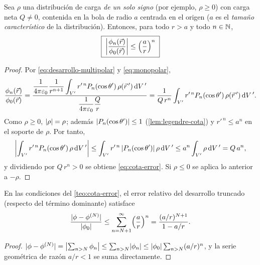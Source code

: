 \begin{teorema}\label{teo:cota-error}
Sea $\rho$ una distribución de carga \emph{de un solo signo} (por ejemplo, $\rho\ge0$) con carga neta $Q\neq0$, contenida en la bola de radio $a$ centrada en el origen
($a$ es el \emph{tamaño característico} de la distribución). Entonces, para todo $r>a$ y todo $n\in\mathbb{N}$,
\begin{equation}\label{eq:cota-error}
  \boxed{\;\left\lvert\frac{\phi_{n}(\vec{r})}{\phi_{0}(\vec{r})}\right\rvert\le\Bigl(\frac{a}{r}\Bigr)^{n}\;}
\end{equation}
\end{teorema}
\begin{proof}
Por \cref{eq:desarrollo-multipolar} y \cref{eq:monopolar},
\[
  \frac{\phi_{n}(\vec{r})}{\phi_{0}(\vec{r})}=\frac{\dfrac{1}{4\pi\varepsilon_{0}}\dfrac{1}{r^{n+1}}\displaystyle\int_{V'}r'^{\,n}P_{n}(\cos\theta')\,\rho(\vec{r}\,')\,\mathrm{d} V\,'}{\dfrac{1}{4\pi\varepsilon_{0}}\dfrac{Q}{r}}
  =\frac{1}{Q\,r^{n}}\int_{V'}r'^{\,n}P_{n}(\cos\theta')\,\rho(\vec{r}\,')\,\mathrm{d} V\,' .
\]
Como $\rho\ge0$, $\lvert \rho\rvert=\rho$; además $\lvert P_{n}(\cos\theta')\rvert\le1$ (\cref{lem:legendre-cota}) y $r'^{\,n}\le a^{n}$ en el soporte de $\rho$. Por tanto,
\[
  \left\lvert\int_{V'}r'^{\,n}P_{n}(\cos\theta')\,\rho\,\mathrm{d} V\,'\right\rvert\le\int_{V'}r'^{\,n}\,\lvert P_{n}(\cos\theta')\rvert\,\rho\,\mathrm{d} V\,'\le a^{n}\int_{V'}\rho\,\mathrm{d} V\,'=Q\,a^{n},
\]
y dividiendo por $Q\,r^{n}>0$ se obtiene \cref{eq:cota-error}. Si $\rho\le0$ se aplica lo anterior a $-\rho$.
\end{proof}

\begin{corolario}\label{cor:resto}
En las condiciones del \cref{teo:cota-error}, el error relativo del desarrollo truncado (respecto del término dominante) satisface
\begin{equation}\label{eq:resto}
  \frac{\lvert \phi-\phi^{(N)}\rvert}{\lvert \phi_{0}\rvert}\le\sum_{n=N+1}^{\infty}\Bigl(\frac{a}{r}\Bigr)^{n}=\frac{(a/r)^{N+1}}{1-a/r}.
\end{equation}
\end{corolario}
\begin{proof}
$\lvert \phi-\phi^{(N)}\rvert=\bigl\lvert\sum_{n>N}\phi_{n}\bigr\rvert\le\sum_{n>N}\lvert \phi_{n}\rvert\le\lvert \phi_{0}\rvert\sum_{n>N}(a/r)^{n}$, y la serie geométrica de razón $a/r<1$ se suma
directamente.
\end{proof}

